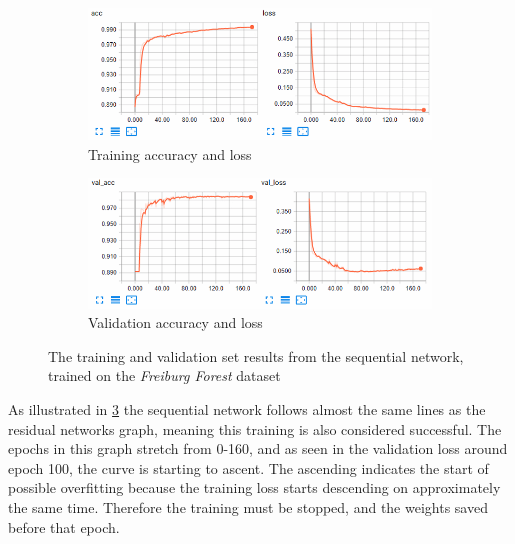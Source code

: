 \documentclass[USenglish]{ifimaster}  %
\begin{document}
\begin{figure}[ht]
\centering
\begin{subfigure}[b]{\textwidth}
\centering
\includegraphics[width=1\textwidth]{bilder/freiburg_training/freiburg_sequential_training_acc_results.png}
\caption{Training accuracy and loss}
\label{fig:freiburg_sequential_acc_result}
\end{subfigure}
\hfill
\begin{subfigure}[b]{\textwidth}
\centering
\includegraphics[width=1\textwidth]{bilder/freiburg_training/freiburg_sequential_training_val_acc_results.png}
\caption{Validation accuracy and loss}
\label{fig:freiburg_sequential_val_acc_result}
\end{subfigure}
\caption{The training and validation set results from the sequential network, trained on the \textit{Freiburg Forest} dataset}
\label{fig:freiburg_sequential_result}
\end{figure}

As illustrated in \cref{fig:freiburg_sequential_result} the sequential network follows almost the same lines as the residual networks graph, meaning this training is also considered successful. The epochs in this graph stretch from 0-160, and as seen in the validation loss around epoch 100, the curve is starting to ascent. The ascending indicates the start of possible overfitting because the training loss starts descending on approximately the same time. Therefore the training must be stopped, and the weights saved before that epoch.
\end{document}

